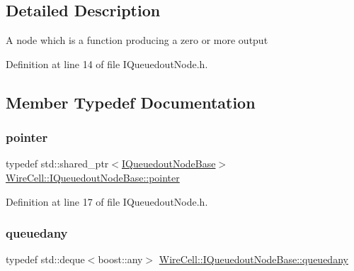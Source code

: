 \subsection{Detailed Description}
A node which is a function producing a zero or more output 

Definition at line 14 of file I\+Queuedout\+Node.\+h.



\subsection{Member Typedef Documentation}
\mbox{\label{class_wire_cell_1_1_i_queuedout_node_base_aa63057649c875c83e25d4078b774b4cb}} 
\subsubsection{\texorpdfstring{pointer}{pointer}}
{\footnotesize\ttfamily typedef std\+::shared\+\_\+ptr$<$\hyperlink{class_wire_cell_1_1_i_queuedout_node_base}{I\+Queuedout\+Node\+Base}$>$ \hyperlink{class_wire_cell_1_1_i_queuedout_node_base_aa63057649c875c83e25d4078b774b4cb}{Wire\+Cell\+::\+I\+Queuedout\+Node\+Base\+::pointer}}



Definition at line 17 of file I\+Queuedout\+Node.\+h.

\mbox{\label{class_wire_cell_1_1_i_queuedout_node_base_a9c144f13ef75e051847fe22888977a11}} 
\subsubsection{\texorpdfstring{queuedany}{queuedany}}
{\footnotesize\ttfamily typedef std\+::deque$<$boost\+::any$>$ \hyperlink{class_wire_cell_1_1_i_queuedout_node_base_a9c144f13ef75e051847fe22888977a11}{Wire\+Cell\+::\+I\+Queuedout\+Node\+Base\+::queuedany}}



